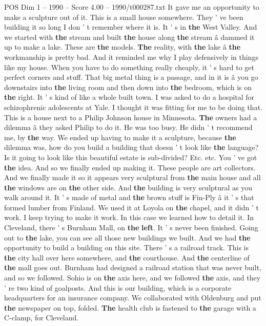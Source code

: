 \begin{textsample}{POS Dim 1 – 1990 – Score 4.00 – 1990/t000287.txt}
It gave me an opportunity to make a sculpture out of it.
This is a small house somewhere.
They ' ve been building it so long I don ' t remember where it is.
It ' s in \textbf{the} West Valley.
And we started with \textbf{the} stream and built \textbf{the} house along \textbf{the} stream â dammed it up to make a lake.
These are \textbf{the} models. \textbf{The} reality, with \textbf{the} lake â \textbf{the} workmanship is pretty bad.
And it reminded me why I play defensively in things like my house.
When you have to do something really cheaply, it ' s hard to get perfect corners and stuff.
That big metal thing is a passage, and in it is â you go downstairs into \textbf{the} living room and then down into \textbf{the} bedroom, which is on \textbf{the} right.
It ' s kind of like a whole built town.
I was asked to do a hospital for schizophrenic adolescents at Yale.
I thought it was fitting for me to be doing that.
This is a house next to a Philip Johnson house in Minnesota. \textbf{The} owners had a dilemma â they asked Philip to do it.
He was too busy.
He didn ' t recommend me, by \textbf{the} way.
We ended up having to make it a sculpture, because \textbf{the} dilemma was, how do you build a building that doesn ' t look like \textbf{the} language?
Is it going to look like this beautiful estate is sub-divided?
Etc. etc.
You ' ve got \textbf{the} idea.
And so we finally ended up making it.
These people are art collectors.
And we finally made it so it appears very sculptural from \textbf{the} main house and all \textbf{the} windows are on \textbf{the} other side.
And \textbf{the} building is very sculptural as you walk around it.
It ' s made of metal and \textbf{the} brown stuff is Fin-Ply â it ' s that formed lumber from Finland.
We used it at Loyola on \textbf{the} chapel, and it didn ' t work.
I keep trying to make it work.
In this case we learned how to detail it.
In Cleveland, there ' s Burnham Mall, on \textbf{the} \textbf{left}.
It ' s never been finished.
Going out to \textbf{the} lake, you can see all those new buildings we built.
And we had \textbf{the} opportunity to build a building on this site.
There ' s a railroad track.
This is \textbf{the} city hall over here somewhere, and \textbf{the} courthouse.
And \textbf{the} centerline of \textbf{the} mall goes out.
Burnham had designed a railroad station that was never built, and so we followed.
Sohio is on \textbf{the} axis here, and we followed \textbf{the} axis, and they ' re two kind of goalposts.
And this is our building, which is a corporate headquarters for an insurance company.
We collaborated with Oldenburg and put \textbf{the} newspaper on top, folded. \textbf{The} health club is fastened to \textbf{the} garage with a C-clamp, for Cleveland.

\end{textsample}
